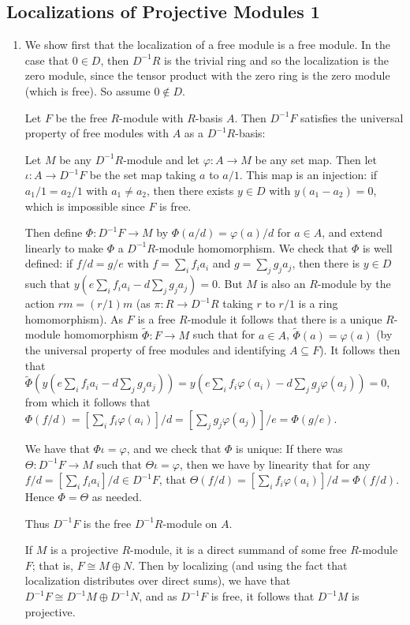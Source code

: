 \documentclass[11pt]{article}
\begin{document}
\subsection*{Localizations of Projective Modules 1}
\begin{enumerate}[label=(\alph*)]
  \item We show first that the localization of a free module is a free module. In the case that $0\in D$, then $D^{-1}R$ is the trivial ring and so the localization is the zero module, since the tensor product with the zero ring is the zero module (which is free). So assume $0\not\in D$.
  
  Let $F$ be the free $R$-module with $R$-basis $A$. Then $D^{-1}F$ satisfies the universal property of free modules with $A$ as a $D^{-1}R$-basis:

  Let $M$ be any $D^{-1}R$-module and let $\varphi\colon A\to M$ be any set map. Then let $\iota\colon A\to D^{-1}F$ be the set map taking $a$ to $a/1$. This map is an injection: if $a_1/1=a_2/1$ with $a_1\neq a_2$, then there exists $y\in D$ with $y(a_1-a_2)=0$, which is impossible since $F$ is free. 

  Then define $\Phi\colon D^{-1}F\to M$ by $\Phi(a/d) = \varphi(a)/d$ for $a\in A$, and extend linearly to make $\Phi$ a $D^{-1}R$-module homomorphism. We check that $\Phi$ is well defined: if $f/d = g/e$ with $f = \sum_i f_i a_i$ and $g = \sum_j g_j a_j$, then there is $y\in D$ such that $y(e\sum_i f_ia_i - d\sum_jg_ja_j)=0$. But $M$ is also an $R$-module by the action $rm = (r/1)m$ (as $\pi\colon R\to D^{-1}R$ taking $r$ to $r/1$ is a ring homomorphism). As $F$ is a free $R$-module it follows that there is a unique $R$-module homomorphism $\tilde \Phi\colon F\to M$ such that for $a\in A$, $\tilde \Phi(a) = \varphi(a)$ (by the universal property of free modules and identifying $A\subseteq F$). It follows then that $\tilde \Phi(y(e\sum_i f_ia_i - d\sum_jg_ja_j)) = y(e\sum_i f_i\varphi(a_i) - d\sum_jg_j\varphi(a_j))=0$, from which it follows that $\Phi(f/d) = [\sum_i f_i \varphi(a_i)]/d = [\sum_j g_j \varphi(a_j)]/e = \Phi(g/e)$.

  We have that $\Phi\iota = \varphi$, and we check that $\Phi$ is unique: If there was $\Theta\colon D^{-1}F\to M$ such that $\Theta\iota = \varphi$, then we have by linearity that for any $f/d = [\sum_i f_i a_i]/d \in D^{-1}F$, that $\Theta(f/d) = [\sum_i f_i \varphi(a_i)]/d = \Phi(f/d)$. Hence $\Phi = \Theta$ as needed.

  Thus $D^{-1}F$ is the free $D^{-1}R$-module on $A$.

  If $M$ is a projective $R$-module, it is a direct summand of some free $R$-module $F$; that is, $F \cong M\oplus N$. Then by localizing (and using the fact that localization distributes over direct sums), we have that $D^{-1}F \cong D^{-1}M\oplus D^{-1}N$, and as $D^{-1}F$ is free, it follows that $D^{-1}M$ is projective.
\end{enumerate}
\end{document}
